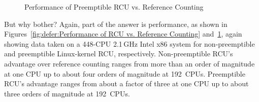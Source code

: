 \begin{figure}[tb]
\centering
{}
\caption{Performance of Preemptible RCU vs. Reference Counting}
\label{fig:defer:Performance of Preemptible RCU vs. Reference Counting}
\end{figure}

But why bother?
Again, part of the answer is performance, as shown in
Figures~\ref{fig:defer:Performance of RCU vs. Reference Counting}
and~\ref{fig:defer:Performance of Preemptible RCU vs. Reference Counting},
again showing data taken on a 448-CPU 2.1\,GHz Intel x86 system
for non-preemptible and preemptible Linux-kernel RCU, respectively.
Non-preemptible RCU's advantage over reference counting ranges from
more than an order of magnitude at one CPU up to about four orders of
magnitude at 192~CPUs.
Preemptible RCU's advantage ranges from about a factor of three at
one CPU up to about three orders of magnitude at 192~CPUs.

